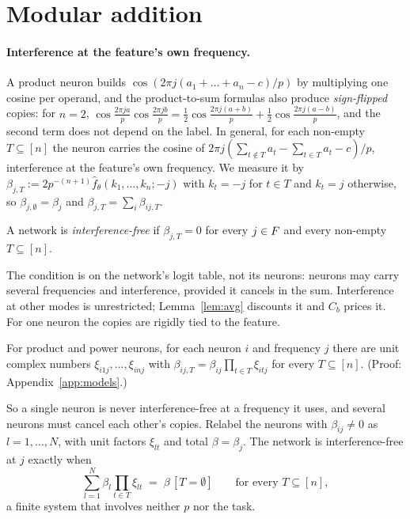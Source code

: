 \section{Modular addition}\label{sec:cyclic}


\paragraph{Interference at the feature's own frequency.}
A product neuron builds $\cos(2\pi j(a_1+\dots+a_n-c)/p)$ by multiplying one cosine per operand, and the product-to-sum formulas also produce \emph{sign-flipped} copies: for $n=2$, $\cos\frac{2\pi ja}p\cos\frac{2\pi jb}p=\frac12\cos\frac{2\pi j(a+b)}p+\frac12\cos\frac{2\pi j(a-b)}p$, and the second term does not depend on the label. In general, for each non-empty $T\subseteq[n]$ the neuron carries the cosine of $2\pi j(\sum_{t\notin T}a_t-\sum_{t\in T}a_t-c)/p$, interference at the feature's own frequency. We measure it by $\beta_{j,T}:=2p^{-(n+1)}\hat f_\theta(k_1,\dots,k_n;-j)$ with $k_t=-j$ for $t\in T$ and $k_t=j$ otherwise, so $\beta_{j,\emptyset}=\beta_j$ and $\beta_{j,T}=\sum_i\beta_{ij,T}$.

\begin{definition}\label{def:if}
A network is \emph{interference-free} if $\beta_{j,T}=0$ for every $j\in F$ and every non-empty $T\subseteq[n]$.
\end{definition}

The condition is on the network's logit table, not its neurons: neurons may carry several frequencies and interference, provided it cancels in the sum. Interference at other modes is unrestricted; Lemma~\ref{lem:avg} discounts it and $C_b$ prices it. For one neuron the copies are rigidly tied to the feature.

\begin{lemma}\label{lem:sign}
For product and power neurons, for each neuron $i$ and frequency $j$ there are unit complex numbers $\xi_{i1j},\dots,\xi_{inj}$ with $\beta_{ij,T}=\beta_{ij}\prod_{t\in T}\xi_{itj}$ for every $T\subseteq[n]$. (Proof: Appendix~\ref{app:models}.)
\end{lemma}

So a single neuron is never interference-free at a frequency it uses, and several neurons must cancel each other's copies. Relabel the neurons with $\beta_{ij}\neq0$ as $l=1,\dots,N$, with unit factors $\xi_{lt}$ and total $\beta=\beta_j$. The network is interference-free at $j$ exactly when
\begin{equation}
  \sum_{l=1}^N\beta_l\prod_{t\in T}\xi_{lt}\;=\;\beta\,[T=\emptyset]\qquad\text{for every }T\subseteq[n],
  \label{eq:JF}
\end{equation}
a finite system that involves neither $p$ nor the task.

